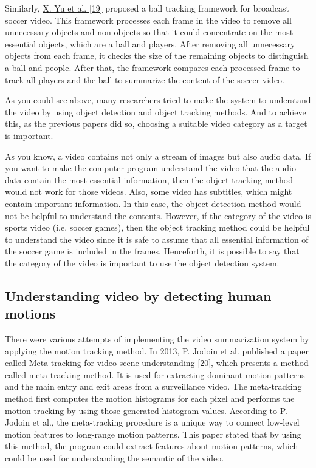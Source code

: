 \documentclass{article}
\begin{document}
Similarly, \hyperlink{ref19}{X. Yu et al. [19]} proposed a ball tracking framework for broadcast soccer video. This framework processes each frame in the video to remove all unnecessary objects and non-objects so that it could concentrate on the most essential objects, which are a ball and players. After removing all unnecessary objects from each frame, it checks the size of the remaining objects to distinguish a ball and people. After that, the framework compares each processed frame to track all players and the ball to summarize the content of the soccer video.

As you could see above, many researchers tried to make the system to understand the video by using object detection and object tracking methods. And to achieve this, as the previous papers did so, choosing a suitable video category as a target is important.

As you know, a video contains not only a stream of images but also audio data. If you want to make the computer program understand the video that the audio data contain the most essential information, then the object tracking method would not work for those videos. Also, some video has subtitles, which might contain important information. In this case, the object detection method would not be helpful to understand the contents. However, if the category of the video is sports video (i.e. soccer games), then the object tracking method could be helpful to understand the video since it is safe to assume that all essential information of the soccer game is included in the frames. Henceforth, it is possible to say that the category of the video is important to use the object detection system.

\subsection{Understanding video by detecting human motions}

There were various attempts of implementing the video summarization system by applying the motion tracking method. In 2013, P. Jodoin et al. published a paper called \hyperlink{ref20}{Meta-tracking for video scene understanding [20]}, which presents a method called meta-tracking method. It is used for extracting dominant motion patterns and the main entry and exit areas from a surveillance video. The meta-tracking method first computes the motion histograms for each pixel and performs the motion tracking by using those generated histogram values. According to P. Jodoin et al., the meta-tracking procedure is a unique way to connect low-level motion features to long-range motion patterns. This paper stated that by using this method, the program could extract features about motion patterns, which could be used for understanding the semantic of the video.
\end{document}
